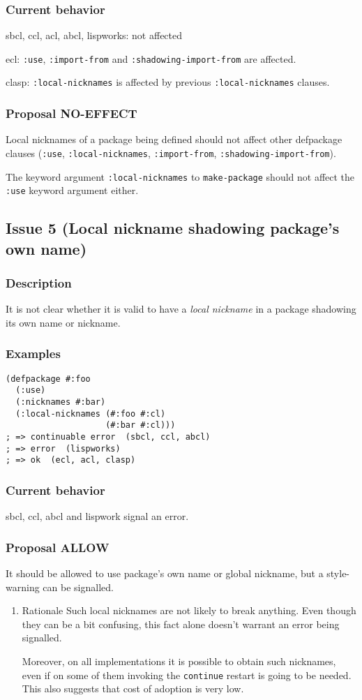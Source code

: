\documentclass[11pt]{article}
\begin{document}
\subsubsection{Current behavior}
\label{sec:orgfd3ed49}
sbcl, ccl, acl, abcl, lispworks: not affected

ecl: \texttt{:use}, \texttt{:import-from} and \texttt{:shadowing-import-from} are affected.

clasp: \texttt{:local-nicknames} is affected by previous \texttt{:local-nicknames} clauses.
\subsubsection{Proposal NO-EFFECT}
\label{sec:orgc38d45f}
Local nicknames of a package being defined should not affect other defpackage
clauses (\texttt{:use}, \texttt{:local-nicknames}, \texttt{:import-from}, \texttt{:shadowing-import-from}).

The keyword argument \texttt{:local-nicknames} to \texttt{make-package} should not affect the
\texttt{:use} keyword argument either.
\subsection{Issue 5 (Local nickname shadowing package's own name)}
\label{sec:org2f08712}
\subsubsection{Description}
\label{sec:orgb53fc69}
It is not clear whether it is valid to have a \emph{local nickname} in a package
shadowing its own name or nickname.
\subsubsection{Examples}
\label{sec:org25fdd01}
\begin{verbatim}
(defpackage #:foo
  (:use)
  (:nicknames #:bar)
  (:local-nicknames (#:foo #:cl)
                    (#:bar #:cl)))
; => continuable error  (sbcl, ccl, abcl)
; => error  (lispworks)
; => ok  (ecl, acl, clasp)
\end{verbatim}
\subsubsection{Current behavior}
\label{sec:org8a312b3}
sbcl, ccl, abcl and lispwork signal an error.
\subsubsection{Proposal ALLOW}
\label{sec:orge71df56}
It should be allowed to use package's own name or global nickname, but a
style-warning can be signalled.
\begin{enumerate}
\item Rationale
\label{sec:orgc726544}
Such local nicknames are not likely to break anything. Even though they can be a
bit confusing, this fact alone doesn't warrant an error being signalled.

Moreover, on all implementations it is possible to obtain such nicknames, even if
on some of them invoking the \texttt{continue} restart is going to be needed. This also
suggests that cost of adoption is very low.
\end{enumerate}
\end{document}
